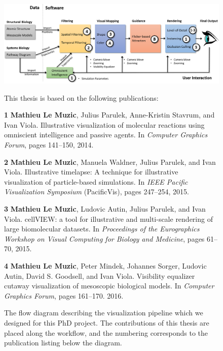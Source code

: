 \begin{figure}
	\centering	
	\caption{The flow diagram describing the visualization pipeline which we designed for this PhD project. 
		The contributions of this thesis are placed along the workflow, and the numbering corresponds to the publication listing below the diagram.}
	
	\subfloat
	{
		\centering
		\includegraphics[width=1\linewidth]{"resources/master diagram3"}
	}	
	\subfloat
	{		
		This thesis is based on the following publications:		
		\begin{list}{}{}			
			\label{fig:list-contributions}
			\item[\textbf{1}]\textbf{Mathieu Le Muzic}, Julius Parulek, Anne-Kristin Stavrum, and Ivan Viola. Illustrative visualization of molecular reactions using omniscient intelligence and passive agents. In \textit{Computer Graphics Forum}, pages 141–150, 2014. 
			
			\item[\textbf{2}]\textbf{Mathieu Le Muzic}, Manuela Waldner, Julius Parulek, and Ivan Viola. Illustrative timelapse: A technique for illustrative visualization of particle-based simulations. In \textit{IEEE Pacific Visualization Symposium} (PacificVis), pages 247–254, 2015.
			
			\item[\textbf{3}]\textbf{Mathieu Le Muzic}, Ludovic Autin, Julius Parulek, and Ivan Viola. cellVIEW: a tool for illustrative and multi-scale rendering of large biomolecular datasets. In \textit{Proceedings of the Eurographics Workshop on Visual Computing for Biology and Medicine}, pages 61–70, 2015.
			
			\item[\textbf{4}]\textbf{Mathieu Le Muzic}, Peter Mindek, Johannes Sorger, Ludovic Autin, David S. Goodsell, and Ivan Viola. Visibility equalizer cutaway visualization of mesoscopic biological models. In \textit{Computer Graphics Forum}, pages 161–170. 2016.				
		\end{list}			
		
}
\end{figure}
